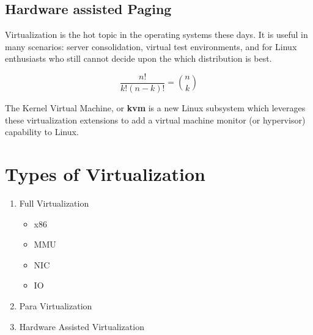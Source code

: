 \documentclass[a4paper,twocolumn,10pt]{article}
\begin{document}
   \subsection{Hardware assisted Paging}
    \noindent Virtualization is the hot topic in the operating systems 
  these days. It is useful in many scenarios: server consolidation,
  virtual test environments, and for Linux enthusiasts who
  still cannot decide upon the which distribution is best.
  
   \begin{displaymath}\frac{n!}{k!(n-k)!}=
  \binom{n}{k}
  \end{displaymath}
  
  \noindent The Kernel Virtual Machine, or \textbf{kvm} is a new Linux
  subsystem which leverages these virtualization extensions
  to add a virtual machine monitor\cite{Sh:12} (or hypervisor) capability to Linux.
  
 \section{Types of Virtualization}
 \begin{enumerate}
  \item Full Virtualization
  \begin{itemize}
   \item x86
   \item MMU
   \item NIC
   \item IO
  \end{itemize}
  \item Para Virtualization
  \item Hardware Assisted Virtualization
 \end{enumerate}
 
 
  
\end{document}
